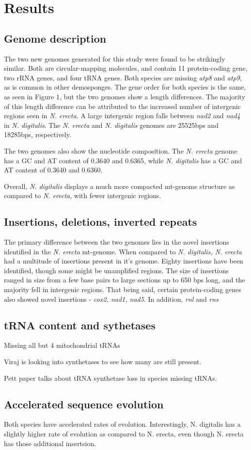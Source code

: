 \documentclass[../main.tex]{subfiles}
\begin{document}
\section{Results}

\subsection{Genome description}
The two new genomes generated for this study were found to be strikingly similar. Both are circular-mapping molecules, and contain 11 protein-coding gene, two rRNA genes, and four tRNA genes. Both species are missing \emph{atp8} and \emph{atp9}, as is common in other demosponges. The gene order for both species is the same, as seen in Figure 1, but the two genomes show a length differences. The majority of this length difference can be attributed to the increased number of intergenic regions seen in \emph{N. erecta}.  A large intergenic region falls between \emph{nad2} and \emph{nad4} in \emph{N. digitalis}. The \emph{N. erecta} and \emph{N. digitalis} genomes are 25525bps and 18285bps, respectively.

The two genomes also show the nucleotide composition. The \emph{N. erecta} genome has a GC and AT content of 0.3640 and 0.6365, while \emph{N. digitalis} has a GC and AT content of 0.3640 and 0.6360. 

Overall, \emph{N. digitalis} displays a much more compacted mt-genome structure as compared to \emph{N. erecta}, with fewer intergenic regions.


\subsection{Insertions, deletions, inverted repeats}
The primary difference between the two genomes lies in the novel insertions identified in the \emph{N. erecta} mt-genome. When compared to \emph{N. digitalis, N. erecta} had a multitude of insertions present in it's genome. Eighty insertions have been identified, though some might be unamplified regions. The size of insertions ranged in size from a few base pairs to large sections up to 650 bps long, and the majority fell in intergenic regions. That being said, certain protein-coding genes also showed novel insertions - \emph{cox2, nad1, nad5}. In addition, \emph{rnl} and \emph{rns}

\subsection{tRNA content and sythetases}
Missing all but 4 mitochondrial tRNAs

Viraj is looking into synthetases to see how many are still present.

Pett paper talks about tRNA synthetase loss in species missing tRNAs. 

\subsection{Accelerated sequence evolution}
Both species have accelerated rates of evolution. Interestingly, N. digitalis has a slightly higher rate of evolution as compared to N. erecta, even though N. erecta has those additional insertsion.
\end{document}
